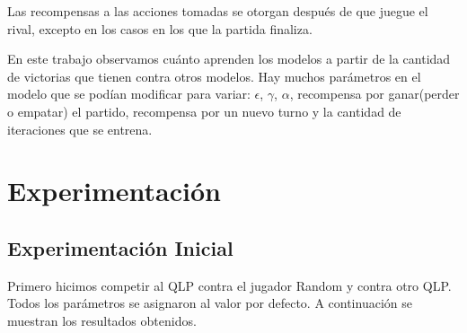 \documentclass[10pt, a4paper]{article}
\begin{document}
Las recompensas a las acciones tomadas se otorgan después de que juegue el rival, excepto en los casos en los que la partida finaliza.


En este trabajo observamos cuánto aprenden los modelos a partir de la cantidad de victorias que tienen contra otros modelos.
Hay muchos parámetros en el modelo que se podían modificar para variar:
$\epsilon$,  $\gamma$, $\alpha$, recompensa por ganar(perder o empatar) el partido, recompensa por un nuevo turno y la cantidad de iteraciones que se entrena.


\section{Experimentación}


\subsection{Experimentación Inicial}


Primero hicimos competir al QLP contra el jugador Random y contra otro QLP. Todos los parámetros se asignaron al valor por defecto. A continuación se muestran los resultados obtenidos.
\end{document}
